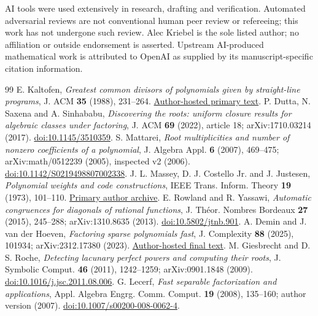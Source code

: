 \documentclass[11pt]{article}
\begin{document}
AI tools were used extensively in research, drafting and verification.
Automated adversarial reviews are not conventional human peer review or
refereeing; this work has not undergone such review. Alec Kriebel is the
sole listed author; no affiliation or outside endorsement is asserted.
Upstream AI-produced mathematical work is attributed to OpenAI as supplied
by its manuscript-specific citation information.

\begin{thebibliography}{99}
 E. Kaltofen, \emph{Greatest common divisors of polynomials
given by straight-line programs}, J. ACM \textbf{35} (1988), 231--264.
\href{https://kaltofen.math.ncsu.edu/bibliography/88/Ka88_jacm.pdf}{Author-hosted primary text}.
 P. Dutta, N. Saxena and A. Sinhababu, \emph{Discovering the
roots: uniform closure results for algebraic classes under factoring},
J. ACM \textbf{69} (2022), article 18; arXiv:1710.03214 (2017).
\href{https://doi.org/10.1145/3510359}{doi:10.1145/3510359}.
 S. Mattarei, \emph{Root multiplicities and number of
nonzero coefficients of a polynomial}, J. Algebra Appl. \textbf{6} (2007),
469--475; arXiv:math/0512239 (2005), inspected v2 (2006).
\href{https://doi.org/10.1142/S0219498807002338}{doi:10.1142/S0219498807002338}.
 J. L. Massey, D. J. Costello Jr. and J. Justesen,
\emph{Polynomial weights and code constructions}, IEEE Trans. Inform.
Theory \textbf{19} (1973), 101--110.
\href{https://www.isiweb.ee.ethz.ch/archive/massey_pub/pdf/BI419.pdf}{Primary author archive}.
 E. Rowland and R. Yassawi, \emph{Automatic congruences for
diagonals of rational functions}, J. Th\'eor. Nombres Bordeaux
\textbf{27} (2015), 245--288; arXiv:1310.8635 (2013).
\href{https://doi.org/10.5802/jtnb.901}{doi:10.5802/jtnb.901}.
 A. Demin and J. van der Hoeven, \emph{Factoring sparse
polynomials fast}, J. Complexity \textbf{88} (2025), 101934;
arXiv:2312.17380 (2023).
\href{https://www.texmacs.org/joris/sparsefact/sparsefact.html}{Author-hosted final text}.
 M. Giesbrecht and D. S. Roche, \emph{Detecting lacunary
perfect powers and computing their roots}, J. Symbolic Comput.
\textbf{46} (2011), 1242--1259; arXiv:0901.1848 (2009).
\href{https://doi.org/10.1016/j.jsc.2011.08.006}{doi:10.1016/j.jsc.2011.08.006}.
 G. Lecerf, \emph{Fast separable factorization and
applications}, Appl. Algebra Engrg. Comm. Comput. \textbf{19} (2008),
135--160; author version (2007).
\href{https://doi.org/10.1007/s00200-008-0062-4}{doi:10.1007/s00200-008-0062-4}.

\end{thebibliography}
\end{document}
